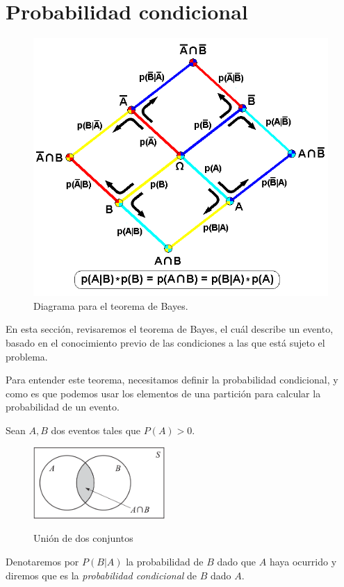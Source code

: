  \section{Probabilidad condicional}

\begin{figure}[b]
	\centering
	\includegraphics[width=0.7\linewidth]{images/Bayes_Theorem_2D}
	\caption{Diagrama para el teorema de Bayes.}
	\label{fig:bayestheorem2d}
\end{figure}


En esta sección, revisaremos el teorema de Bayes, el cuál describe un evento, basado en el conocimiento previo de las condiciones a las que está sujeto el problema. 

Para entender este teorema, necesitamos definir la probabilidad condicional, y como es que podemos usar los elementos de una partición para calcular la probabilidad de un evento.

Sean $A,B$ dos eventos tales que $P(A)>0.$
\begin{figure}
	\centering
	\includegraphics[width=5cm,keepaspectratio=true]{./pe/pands0103.png}
	\label{pands0103}
	\caption{Unión de dos conjuntos}
\end{figure}

Denotaremos por $P(B|A)$
la probabilidad de $B$ dado que $A$ haya ocurrido y diremos que es la \emph{probabilidad condicional} de $B$ dado $A.$



